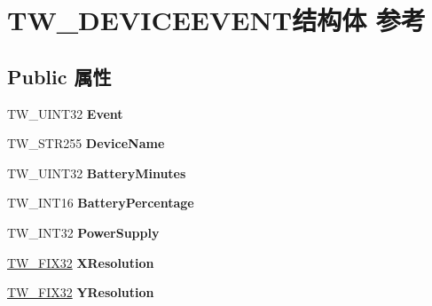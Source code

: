 \hypertarget{struct_t_w___d_e_v_i_c_e_e_v_e_n_t}{}\section{T\+W\+\_\+\+D\+E\+V\+I\+C\+E\+E\+V\+E\+N\+T结构体 参考}
\label{struct_t_w___d_e_v_i_c_e_e_v_e_n_t}
\subsection*{Public 属性}
\begin{DoxyCompactItemize}
\item 
\mbox{\label{struct_t_w___d_e_v_i_c_e_e_v_e_n_t_a25d412b1ea7d7ed6b3ffc15fad02e0bb}} 
T\+W\+\_\+\+U\+I\+N\+T32 {\bfseries Event}
\item 
\mbox{\label{struct_t_w___d_e_v_i_c_e_e_v_e_n_t_a501eeb8ac12cd425513959b0fae4dddf}} 
T\+W\+\_\+\+S\+T\+R255 {\bfseries Device\+Name}
\item 
\mbox{\label{struct_t_w___d_e_v_i_c_e_e_v_e_n_t_aa93b182967e8781adea588b20f5a6c2b}} 
T\+W\+\_\+\+U\+I\+N\+T32 {\bfseries Battery\+Minutes}
\item 
\mbox{\label{struct_t_w___d_e_v_i_c_e_e_v_e_n_t_a44e06e091952be43fb77570392b834d8}} 
T\+W\+\_\+\+I\+N\+T16 {\bfseries Battery\+Percentage}
\item 
\mbox{\label{struct_t_w___d_e_v_i_c_e_e_v_e_n_t_a7f988cc84dd9bf30f80022ef5eb1d596}} 
T\+W\+\_\+\+I\+N\+T32 {\bfseries Power\+Supply}
\item 
\mbox{\label{struct_t_w___d_e_v_i_c_e_e_v_e_n_t_a3dbb03f9a3e3de3307484e6e2d56a020}} 
\hyperlink{struct_t_w___f_i_x32}{T\+W\+\_\+\+F\+I\+X32} {\bfseries X\+Resolution}
\item 
\mbox{\label{struct_t_w___d_e_v_i_c_e_e_v_e_n_t_aad8ffed614e2774a4d94019ccc7f0b95}} 
\hyperlink{struct_t_w___f_i_x32}{T\+W\+\_\+\+F\+I\+X32} {\bfseries Y\+Resolution}
\item 

\end{DoxyCompactItemize}
